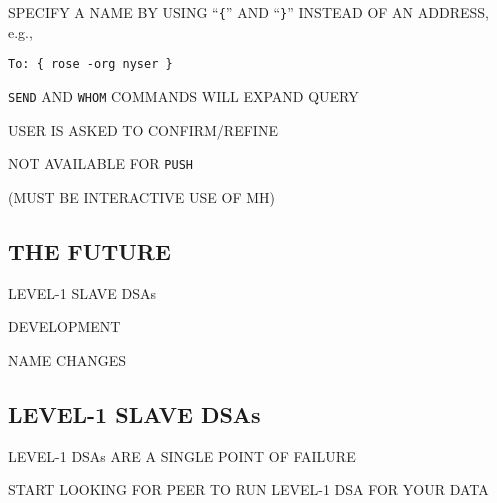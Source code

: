 \begin{bwslide}

\begin{nrtc}
\item	SPECIFY A NAME BY USING ``\verb"{"'' AND ``\verb"}"''  INSTEAD OF
AN ADDRESS, e.g.,
    \begin{nrtc}
    \item	\verb"To: { rose -org nyser }"
    \end{nrtc}

\item	\verb"SEND" AND \verb"WHOM" COMMANDS WILL EXPAND QUERY
    \begin{nrtc}
    \item	USER IS ASKED TO CONFIRM/REFINE
    \end{nrtc}

\item	NOT AVAILABLE FOR \verb"PUSH"
    \begin{nrtc}
    \item	(MUST BE INTERACTIVE USE OF MH)
    \end{nrtc}
\end{nrtc}
\end{bwslide}


\begin{bwslide}
\part	{THE FUTURE}\bf

\begin{nrtc}
\item	LEVEL-1 SLAVE DSAs

\item	DEVELOPMENT

\item	NAME CHANGES
\end{nrtc}
\end{bwslide}


\begin{bwslide}
\part*	{LEVEL-1 SLAVE DSAs}\bf

\begin{nrtc}
\item	LEVEL-1 DSAs ARE A SINGLE POINT OF FAILURE

\item	START LOOKING FOR PEER TO RUN LEVEL-1 DSA FOR YOUR DATA
\end{nrtc}
\end{bwslide}


